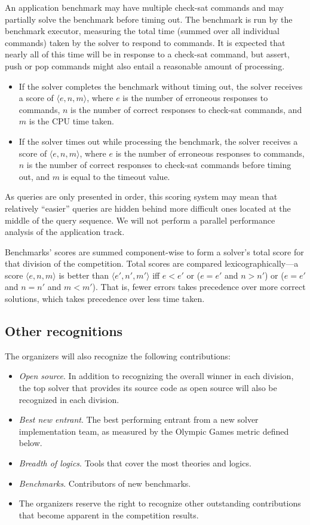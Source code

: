 \documentclass[12pt]{article}
\begin{document}
An application benchmark may have multiple check-sat commands and may partially solve the benchmark before timing out.
The benchmark is run by the benchmark executor, measuring the total time (summed over all individual commands) taken by
the solver to respond to commands. It is expected that nearly all of this time will be in response to a check-sat command, but assert, push or pop commands might also entail a reasonable amount of processing.
\begin{itemize}
\item If the solver completes the benchmark without timing out, the solver receives a score of $\langle e,n,m\rangle$,
where $e$ is the number of erroneous responses to commands, $n$ is the number of correct responses to check-sat commands, and $m$ is the CPU time taken.
\item If the solver times out while processing the benchmark, the solver receives a score of $\langle e,n,m\rangle$,
where $e$ is the number of erroneous responses to commands, $n$ is the number of correct responses to check-sat commands before timing out, and $m$ is equal to the timeout value.
\end{itemize}

As queries are only presented in order, this scoring system may mean
that relatively ``easier'' queries are hidden behind more difficult
ones located at the middle of the query sequence. We will not perform a parallel performance analysis of the application track.

\label{scoring}
Benchmarks' scores are summed component-wise to form a solver's total
score for that division of the competition.
Total scores are compared lexicographically---a score $\langle e,n,m\rangle$ is better than 
$\langle e',n',m'\rangle$ iff $e < e'$ or ($e = e'$ and $n > n'$) or ($e = e'$ and $n = n'$ and $m < m'$).
That is, fewer errors takes precedence over more correct solutions, which takes precedence over less time taken.

\subsection{Other recognitions}
The organizers will also recognize the following contributions:
\begin{itemize}
\item {\em Open source}. In addition to recognizing the overall
winner in each division, the top solver that provides its source code as open source will also be
recognized in each division.  
\item {\em Best new entrant}. The best performing entrant from a new solver implementation team, as measured by the Olympic Games metric defined below.
\item {\em Breadth of logics}. Tools that cover the most theories and logics.
\item {\em Benchmarks}. Contributors of new benchmarks.
\item The organizers reserve the right to recognize other outstanding contributions that become apparent in the competition results.
\end{itemize}
\end{document}
